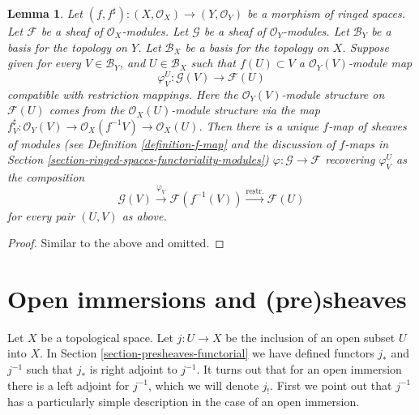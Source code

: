 \documentclass{stacks-project}
\theoremstyle{plain}
\newtheorem{lemma}[subsection]{Lemma}
\theoremstyle{definition}
\theoremstyle{remark}
\numberwithin{equation}{subsection}
\begin{document}
\begin{lemma}
\label{lemma-f-map-basis-above-and-below-modules}
Let $(f, f^\sharp) : (X, \mathcal{O}_X) \to (Y, \mathcal{O}_Y)$
be a morphism of ringed spaces.
Let $\mathcal{F}$ be a sheaf of $\mathcal{O}_X$-modules.
Let $\mathcal{G}$ be a sheaf of $\mathcal{O}_Y$-modules.
Let $\mathcal{B}_Y$ be a basis for the topology on $Y$.
Let $\mathcal{B}_X$ be a basis for the topology on $X$.
Suppose given for every $V \in \mathcal{B}_Y$, and
$U \in \mathcal{B}_X$ such that $f(U) \subset V$ a
$\mathcal{O}_Y(V)$-module map
$$
\varphi_V^U :
\mathcal{G}(V)
\longrightarrow
\mathcal{F}(U)
$$
compatible with restriction mappings. Here the
$\mathcal{O}_Y(V)$-module structure on $\mathcal{F}(U)$
comes from the $\mathcal{O}_X(U)$-module structure
via the map $f^\sharp_V : \mathcal{O}_Y(V)
\to \mathcal{O}_X(f^{-1}V) \to \mathcal{O}_X(U)$.
Then there is a unique $f$-map of sheaves of modules (see
Definition \ref{definition-f-map} and the discussion
of $f$-maps in Section \ref{section-ringed-spaces-functoriality-modules})
$\varphi : \mathcal{G} \to \mathcal{F}$
recovering $\varphi_V^U$ as the composition
$$
\mathcal{G}(V) \xrightarrow{\varphi_V}
\mathcal{F}(f^{-1}(V)) \xrightarrow{\text{restr.}}
\mathcal{F}(U)
$$
for every pair $(U, V)$ as above.
\end{lemma}

\begin{proof}
Similar to the above and omitted.
\end{proof}

\section{Open immersions and (pre)sheaves}
\label{section-open-immersions}

\noindent
Let $X$ be a topological space.
Let $j : U \to X$ be the inclusion of an open subset $U$ into $X$.
In Section \ref{section-presheaves-functorial} we have defined
functors $j_*$ and $j^{-1}$ such that $j_*$ is right adjoint to
$j^{-1}$. It turns out that for an open immersion there is a left adjoint
for $j^{-1}$, which we will denote $j_!$. First we point out that
$j^{-1}$ has a particularly simple description in the case of
an open immersion.
\end{document}
